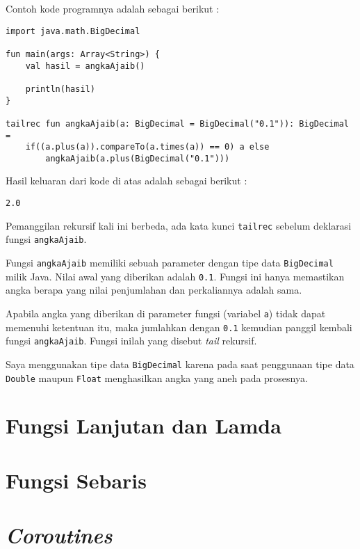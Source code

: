 Contoh kode programnya adalah sebagai berikut :

\begin{lstlisting}
import java.math.BigDecimal

fun main(args: Array<String>) {
	val hasil = angkaAjaib()
	
	println(hasil)
}

tailrec fun angkaAjaib(a: BigDecimal = BigDecimal("0.1")): BigDecimal =
	if((a.plus(a)).compareTo(a.times(a)) == 0) a else 
		angkaAjaib(a.plus(BigDecimal("0.1")))
\end{lstlisting}

Hasil keluaran dari kode di atas adalah sebagai berikut :

\begin{lstlisting}
2.0
\end{lstlisting}

Pemanggilan rekursif kali ini berbeda, ada kata kunci \texttt{tailrec} sebelum deklarasi fungsi \texttt{angkaAjaib}.

Fungsi \texttt{angkaAjaib} memiliki sebuah parameter dengan tipe data \texttt{BigDecimal} milik Java. Nilai awal yang diberikan adalah \texttt{0.1}. Fungsi ini hanya memastikan angka berapa yang nilai penjumlahan dan perkaliannya adalah sama.

Apabila angka yang diberikan di parameter fungsi (variabel \texttt{a}) tidak dapat memenuhi ketentuan itu, maka jumlahkan dengan \texttt{0.1} kemudian panggil kembali fungsi \texttt{angkaAjaib}. Fungsi inilah yang disebut \textit{tail} rekursif.

Saya menggunakan tipe data \texttt{BigDecimal} karena pada saat penggunaan tipe data \texttt{Double} maupun \texttt{Float} menghasilkan angka yang aneh pada prosesnya.

\section{Fungsi Lanjutan dan Lamda}

\section{Fungsi Sebaris}

\section{\textit{Coroutines}}
